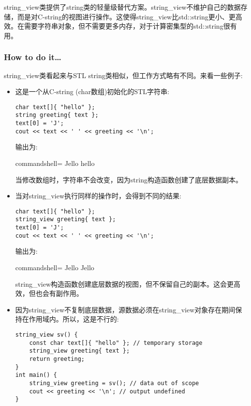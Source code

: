 
string\_view类提供了string类的轻量级替代方案。string\_view不维护自己的数据存储，而是对C-string的视图进行操作。这使得string\_view比std::string更小、更高效。在需要字符串对象，但不需要更多内存，对于计算密集型的std::string很有用。

\subsubsection{How to do it…}

string\_view类看起来与STL string类相似，但工作方式略有不同。来看一些例子:

\begin{itemize}
\item 
这是一个从C-string (char数组)初始化的STL字符串:

\begin{lstlisting}[style=styleCXX]
char text[]{ "hello" };
string greeting{ text };
text[0] = 'J';
cout << text << ' ' << greeting << '\n';
\end{lstlisting}

输出为:

\begin{tcblisting}{commandshell={}}
Jello hello
\end{tcblisting}

当修改数组时，字符串不会改变，因为string构造函数创建了底层数据副本。

\item 
当对string\_view执行同样的操作时，会得到不同的结果:

\begin{lstlisting}[style=styleCXX]
char text[]{ "hello" };
string_view greeting{ text };
text[0] = 'J';
cout << text << ' ' << greeting << '\n';
\end{lstlisting}

输出为:

\begin{tcblisting}{commandshell={}}
Jello Jello
\end{tcblisting}

string\_view构造函数创建底层数据的视图，但不保留自己的副本。这会更高效，但也会有副作用。

\item 
因为string\_view不复制底层数据，源数据必须在string\_view对象存在期间保持在作用域内。所以，这是不行的:

\begin{lstlisting}[style=styleCXX]
string_view sv() {
	const char text[]{ "hello" }; // temporary storage
	string_view greeting{ text };
	return greeting;
}
int main() {
	string_view greeting = sv(); // data out of scope
	cout << greeting << '\n'; // output undefined
}
\end{lstlisting}


\end{itemize}
